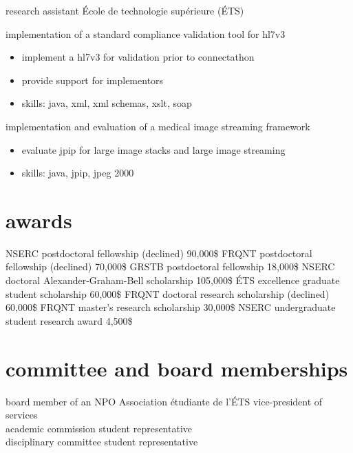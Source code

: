 \documentclass[print]{friggeri-cv}
\begin{document}
\begin{entrylist}
  {research assistant}
  {École de technologie supérieure {\scriptsize (ÉTS)}}
  {implementation of a standard compliance validation tool for hl{\small7}v{\small3}
  \begin{itemize}
    \item implement a hl{\small7}v{\small3} for validation prior to connectathon
    \item provide support for implementors
  \item skills: java, xml, xml schemas, xslt, soap
  \end{itemize}
  implementation and evaluation of a medical image streaming framework
  \begin{itemize}
    \item evaluate jpip for large image stacks and large image streaming
    \item skills: java, jpip, jpeg 2000
  \end{itemize}
  }
\end{entrylist}

\section{awards}
\begin{entrylist}
   {{\small NSERC} postdoctoral fellowship (declined)} {90,000\$} {\vspace{-3mm}}
   {{\small FRQNT} postdoctoral fellowship (declined)} {70,000\$} {\vspace{-3mm}}
   {{\small GRSTB} postdoctoral fellowship} {18,000\$} {\vspace{-3mm}}
   {{\small NSERC} doctoral Alexander-Graham-Bell scholarship} {105,000\$} {\vspace{-3mm}}
   {{\small ÉTS} excellence graduate student scholarship} {60,000\$} {\vspace{-3mm}}
   {{\small FRQNT} doctoral research scholarship (declined)} {60,000\$} {\vspace{-3mm}}
   {{\small FRQNT} master's research scholarship} {30,000\$} {\vspace{-3mm}}
   {{\small NSERC} undergraduate student research award} {4,500\$} {\vspace{-3mm}}
 \end{entrylist}
\vspace{2mm}

\section{committee and board memberships}
\begin{entrylist}
  {board member of an {\small NPO}} {Association étudiante de l'{\scriptsize ÉTS}} {vice-president of services\\ academic commission student representative \\ disciplinary committee student representative}
\end{entrylist}
\end{document}
